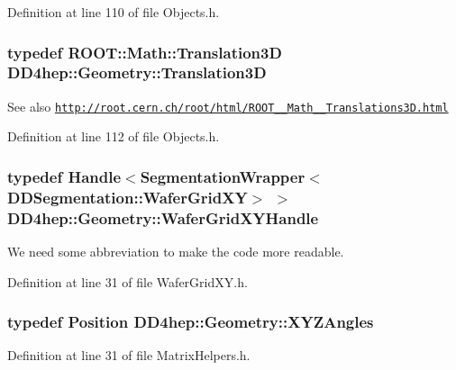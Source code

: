Definition at line 110 of file Objects.h.\hypertarget{namespace_d_d4hep_1_1_geometry_ab90afde486c9b46f4fa91bc659271b99}{
\subsubsection[{Translation3D}]{\setlength{\rightskip}{0pt plus 5cm}typedef ROOT::Math::Translation3D {\bf DD4hep::Geometry::Translation3D}}}
\label{namespace_d_d4hep_1_1_geometry_ab90afde486c9b46f4fa91bc659271b99}
\begin{DoxySeeAlso}{See also}
\href{http://root.cern.ch/root/html/ROOT__Math__Translations3D.html}{\tt http://root.cern.ch/root/html/ROOT\_\-\_\-Math\_\-\_\-Translations3D.html} 
\end{DoxySeeAlso}


Definition at line 112 of file Objects.h.\hypertarget{namespace_d_d4hep_1_1_geometry_a867af80aa83c181772e515bb22a1de35}{
\subsubsection[{WaferGridXYHandle}]{\setlength{\rightskip}{0pt plus 5cm}typedef {\bf Handle}$<${\bf SegmentationWrapper}$<${\bf DDSegmentation::WaferGridXY}$>$ $>$ {\bf DD4hep::Geometry::WaferGridXYHandle}}}
\label{namespace_d_d4hep_1_1_geometry_a867af80aa83c181772e515bb22a1de35}


We need some abbreviation to make the code more readable. 

Definition at line 31 of file WaferGridXY.h.\hypertarget{namespace_d_d4hep_1_1_geometry_ab195c63789d4928d291d3b5522151aaa}{
\subsubsection[{XYZAngles}]{\setlength{\rightskip}{0pt plus 5cm}typedef {\bf Position} {\bf DD4hep::Geometry::XYZAngles}}}
\label{namespace_d_d4hep_1_1_geometry_ab195c63789d4928d291d3b5522151aaa}


Definition at line 31 of file MatrixHelpers.h.

